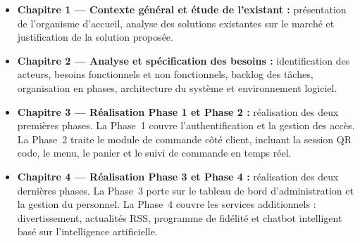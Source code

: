 \begin{itemize}
    \item \textbf{Chapitre 1 --- Contexte général et étude de l'existant :} présentation de
    l'organisme d'accueil, analyse des solutions existantes sur le marché et justification
    de la solution proposée.

    \item \textbf{Chapitre 2 --- Analyse et spécification des besoins :} identification des acteurs,
    besoins fonctionnels et non fonctionnels, backlog des tâches, organisation en phases,
    architecture du système et environnement logiciel.

    \item \textbf{Chapitre 3 --- Réalisation Phase 1 et Phase 2 :} réalisation des deux premières
    phases. La Phase~1 couvre l'authentification et la gestion des accès. La Phase~2 traite
    le module de commande côté client, incluant la session QR code, le menu, le panier
    et le suivi de commande en temps réel.

    \item \textbf{Chapitre 4 --- Réalisation Phase 3 et Phase 4 :} réalisation des deux dernières
    phases. La Phase~3 porte sur le tableau de bord d'administration et la gestion du
    personnel. La Phase~4 couvre les services additionnels : divertissement, actualités RSS,
    programme de fidélité et chatbot intelligent basé sur l'intelligence artificielle.
\end{itemize}
